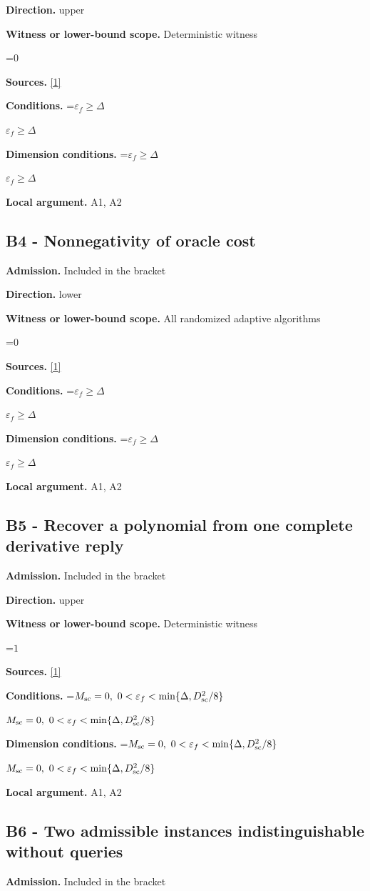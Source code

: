 \documentclass[10pt,a4paper]{article}
\newcommand{\AtlasMath}[1]{\par\begingroup\centering\setbox0=\hbox{$\displaystyle #1$}\ifdim\wd0>1.4\linewidth\typeout{ATLAS WIDE FORMULA: \the\wd0}\fi\ifdim\wd0>\linewidth\resizebox{\linewidth}{!}{\box0}\else\box0\fi\par\endgroup}
\newcommand{\AtlasInlineMath}[1]{\begingroup\setbox0=\hbox{$#1$}\ifdim\wd0>.4\linewidth\endgroup\AtlasMath{#1}\else\endgroup$#1$\fi}
\begin{document}
\textbf{Direction.} upper

\textbf{Witness or lower-bound scope.} Deterministic witness

\AtlasMath{0}
\textbf{Sources.} \href{https://arxiv.org/pdf/2408.11022v1}{[1]}

\textbf{Conditions.} \AtlasInlineMath{\varepsilon_f\ge\Delta}

\textbf{Dimension conditions.} \AtlasInlineMath{\varepsilon_f\ge\Delta}

\textbf{Local argument.} A1, A2

\subsection{B4 - Nonnegativity of oracle cost}
\textbf{Admission.} Included in the bracket

\textbf{Direction.} lower

\textbf{Witness or lower-bound scope.} All randomized adaptive algorithms

\AtlasMath{0}
\textbf{Sources.} \href{https://arxiv.org/pdf/2408.11022v1}{[1]}

\textbf{Conditions.} \AtlasInlineMath{\varepsilon_f\ge\Delta}

\textbf{Dimension conditions.} \AtlasInlineMath{\varepsilon_f\ge\Delta}

\textbf{Local argument.} A1, A2

\subsection{B5 - Recover a polynomial from one complete derivative reply}
\textbf{Admission.} Included in the bracket

\textbf{Direction.} upper

\textbf{Witness or lower-bound scope.} Deterministic witness

\AtlasMath{1}
\textbf{Sources.} \href{https://arxiv.org/pdf/2408.11022v1}{[1]}

\textbf{Conditions.} \AtlasInlineMath{M_{\rm sc}=0,\ 0<\varepsilon_f<\min\{\Delta,D_{\rm sc}^2/8\}}

\textbf{Dimension conditions.} \AtlasInlineMath{M_{\rm sc}=0,\ 0<\varepsilon_f<\min\{\Delta,D_{\rm sc}^2/8\}}

\textbf{Local argument.} A1, A2

\subsection{B6 - Two admissible instances indistinguishable without queries}
\textbf{Admission.} Included in the bracket
\end{document}
